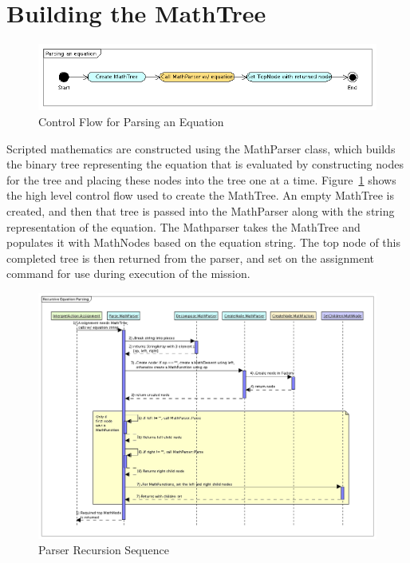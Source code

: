 \section{Building the MathTree}

\begin{figure}
\begin{center}
\includegraphics[430,80]{Images/MathParserTop.png}
\caption{\label{figure:MathParserTop}Control Flow for Parsing an Equation}
\end{center}
\end{figure}

Scripted mathematics are constructed using the MathParser class, which builds
the binary tree representing the equation that is evaluated by constructing
nodes for the tree and placing these nodes into the tree one at a time.
Figure~\ref{figure:MathParserTop} shows the high level control flow used to
create the MathTree.  An empty MathTree is created, and then that tree is
passed into the MathParser along with the string representation of the
equation.  The Mathparser takes the MathTree and populates it with MathNodes
based on the equation string.  The top node of this completed tree is then
returned from the parser, and set on the assignment command for use during
execution of the mission.

\begin{figure}
\begin{center}
\includegraphics[430,313]{Images/ParseRecursion.png}
\caption{\label{figure:ParserRecursion}Parser Recursion Sequence}
\end{center}
\end{figure}

